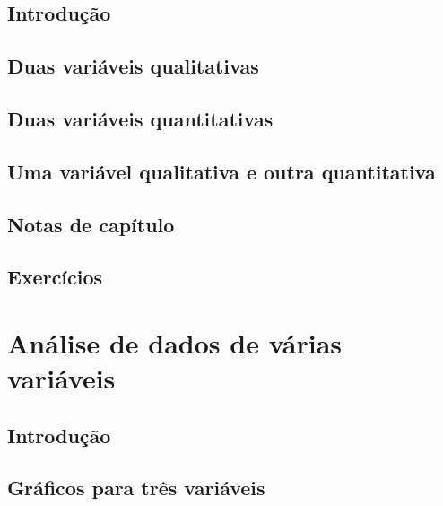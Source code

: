 \documentclass[
]{latex/krantz}
\theoremstyle{definition}
\theoremstyle{definition}
\theoremstyle{definition}
\theoremstyle{definition}
\theoremstyle{remark}
\begin{document}
\hypertarget{introduuxe7uxe3o-2}{%
\section{Introdução}\label{introduuxe7uxe3o-2}}

\hypertarget{duas-variuxe1veis-qualitativas}{%
\section{Duas variáveis qualitativas}\label{duas-variuxe1veis-qualitativas}}

\hypertarget{duas-variuxe1veis-quantitativas}{%
\section{Duas variáveis quantitativas}\label{duas-variuxe1veis-quantitativas}}

\hypertarget{uma-variuxe1vel-qualitativa-e-outra-quantitativa}{%
\section{Uma variável qualitativa e outra quantitativa}\label{uma-variuxe1vel-qualitativa-e-outra-quantitativa}}

\hypertarget{notas-de-capuxedtulo-2}{%
\section{Notas de capítulo}\label{notas-de-capuxedtulo-2}}

\hypertarget{exercuxedcios-2}{%
\section{Exercícios}\label{exercuxedcios-2}}

\hypertarget{anuxe1lise-de-dados-de-vuxe1rias-variuxe1veis}{%
\chapter{Análise de dados de várias variáveis}\label{anuxe1lise-de-dados-de-vuxe1rias-variuxe1veis}}

\hypertarget{introduuxe7uxe3o-3}{%
\section{Introdução}\label{introduuxe7uxe3o-3}}

\hypertarget{gruxe1ficos-para-truxeas-variuxe1veis}{%
\section{Gráficos para três variáveis}\label{gruxe1ficos-para-truxeas-variuxe1veis}}
\end{document}

